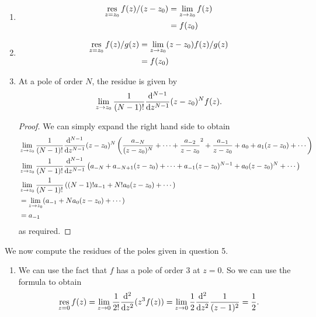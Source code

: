 \documentclass[a4paper]{article}
\begin{document}
\begin{enumerate}
	\item 
	
	\begin{align*}
	\operatorname*{res}_{z = z_0}f(z)/ (z- z_{0}) & = \lim_{z \to z_0} f(z) \\
	& = f(z_{0})
	\end{align*}
	
	\item 
	
	\begin{align*}
	\operatorname*{res}_{z = z_0}f(z)/ g(z) & = \lim_{z \to z_0} (z - z_0) f(z)/ g(z) \\
	& = f(z_{0})
	\end{align*}
	
	
	\item 
	
	\begin{prop}
		At a pole of order $N$, the residue is given by
		\[
		\lim_{z \to z_0} \frac{1}{(N - 1)!} \frac{\mathrm{d}^{N - 1}}{\mathrm{d} z^{N - 1}} (z - z_0)^N f(z).
		\]
	\end{prop}

	\begin{proof}
		We can simply expand the right hand side to obtain
		\begin{align*}
		& \lim_{z \to z_0} \frac{1}{(N - 1)!} \frac{\mathrm{d}^{N - 1}}{\mathrm{d} z^{N - 1}} (z - z_0)^{N}   \left(  \frac{a_{-N}}{(z - z_0)^{N}} + \cdots +  \frac{a_{-2}}{z - z_0}^{2} +    \frac{a_{-1}}{z - z_0} + a_0 + a_1(z - z_0) + \cdots\right) \\
		& \lim_{z \to z_0} \frac{1}{(N - 1)!} \frac{\mathrm{d}^{N - 1}}{\mathrm{d} z^{N - 1}} \left(  a_{-N} + a_{-N+1} (z - z_{0}) + \cdots +  a_{-1} (z-z_{0})^{N-1}  + a_0(z - z_{0}  )^N + \cdots   \right) \\
		& \lim_{z \to z_0} \frac{1}{(N - 1)!} \left((N-1)! a_{-1} + N! a_0(z - z_{0}  ) + \cdots   \right) \\
		&= \lim_{z \to z_0} (a_{-1} + N a_0(z - z_0) +\cdots) \\
		&= a_{-1}
		\end{align*}
		as required.
	\end{proof}
	
	
\end{enumerate}

We now compute the residues of the poles given in question 5.

\begin{enumerate}
	\item We can use the fact that $f$ has a pole of order $3$ at $z = 0$. So we can use the formula to obtain
	\[
	\operatorname*{res}_{z = 0} f(z) = \lim_{z \to 0} \frac{1}{2!} \frac{\mathrm{d}^2}{\mathrm{d} z^2} (z^3 f(z)) = \lim_{z \to 0} \frac{1}{2} \frac{\mathrm{d}^2}{\mathrm{d} z^2} \frac{1}{(z-1)^{2}} = \frac{1}{2}.
	\]
	
\end{enumerate}
\end{document}
